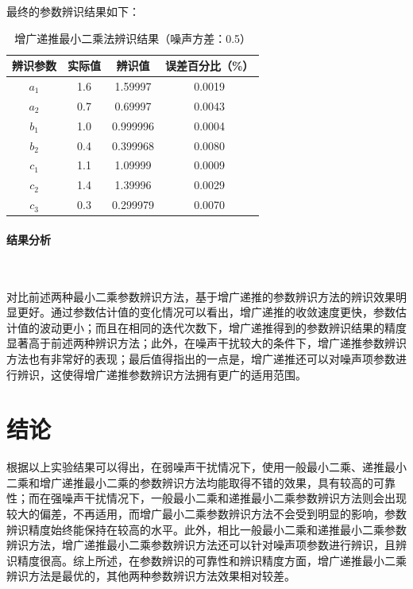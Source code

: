 \documentclass[UTF8]{article}
\begin{document}
最终的参数辨识结果如下：
\begin{table}[H]
\centering %
\begin{tabular}{cccc} %
    \toprule %
    辨识参数 & 实际值 & 辨识值 & 误差百分比（\%） \\
    \midrule %
    $a_1$ & 1.6 & 1.59997 & 0.0019 \\
    $a_2$ & 0.7 & 0.69997 & 0.0043 \\
    $b_1$ & 1.0 & 0.999996 & 0.0004 \\
    $b_2$ & 0.4 & 0.399968 & 0.0080 \\
    $c_1$ & 1.1 & 1.09999 & 0.0009 \\
    $c_2$ & 1.4 & 1.39996 & 0.0029 \\
    $c_3$ & 0.3 & 0.299979 & 0.0070 \\
    \bottomrule %
\end{tabular}
\caption{增广递推最小二乘法辨识结果（噪声方差：0.5）} %
\end{table}

\paragraph{结果分析}~{}

对比前述两种最小二乘参数辨识方法，基于增广递推的参数辨识方法的辨识效果明显更好。通过参数估计值的变化情况可以看出，增广递推的收敛速度更快，参数估计值的波动更小；而且在相同的迭代次数下，增广递推得到的参数辨识结果的精度显著高于前述两种辨识方法；此外，在噪声干扰较大的条件下，增广递推参数辨识方法也有非常好的表现；最后值得指出的一点是，增广递推还可以对噪声项参数进行辨识，这使得增广递推参数辨识方法拥有更广的适用范围。

%
\section{结论}
根据以上实验结果可以得出，在弱噪声干扰情况下，使用一般最小二乘、递推最小二乘和增广递推最小二乘的参数辨识方法均能取得不错的效果，具有较高的可靠性；而在强噪声干扰情况下，一般最小二乘和递推最小二乘参数辨识方法则会出现较大的偏差，不再适用，而增广最小二乘参数辨识方法不会受到明显的影响，参数辨识精度始终能保持在较高的水平。此外，相比一般最小二乘和递推最小二乘参数辨识方法，增广递推最小二乘参数辨识方法还可以针对噪声项参数进行辨识，且辨识精度很高。综上所述，在参数辨识的可靠性和辨识精度方面，增广递推最小二乘辨识方法是最优的，其他两种参数辨识方法效果相对较差。


\begin{titlepage}

\end{titlepage}
\setcounter{section}{0}
%
\end{document}
